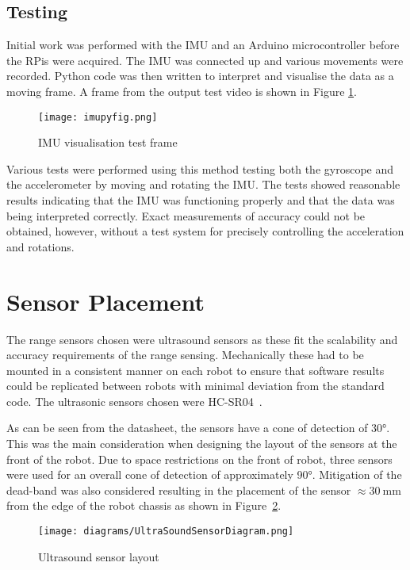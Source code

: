 \subsection{Testing}\label{elec/imu/test}
Initial work was performed with the IMU and an Arduino microcontroller
before the RPis were acquired. The IMU was connected up and various
movements were recorded. Python code was then written to interpret and
visualise the data as a moving frame. A frame from the output test video is shown in Figure \ref{fig:imu_py_test}.

\begin{figure}[!ht]
	\centering
	\texttt{[image: imupyfig.png]}
	\caption{IMU visualisation test frame}\label{fig:imu_py_test}

\end{figure}

Various tests were performed using this method testing both the gyroscope and the
accelerometer by moving and rotating the IMU. The tests showed reasonable results
indicating that the IMU was functioning properly and that the data was being interpreted
correctly. Exact measurements of accuracy could not be obtained, however, without a test
system for precisely controlling the acceleration and rotations.

\section{Sensor Placement}\label{mech/sensors}
The range sensors chosen were ultrasound sensors as these fit the
scalability and accuracy requirements of the range sensing. 
Mechanically these had to be mounted in a consistent manner on each 
robot to ensure that software results could be replicated between 
robots with minimal deviation from the standard code. The ultrasonic 
sensors chosen were HC-SR04~\cite{HCSR04datasheet}.

As can be seen from the datasheet, the sensors have a cone of 
detection of \ang{30}. This was the main consideration when designing 
the layout of the sensors at the front of the robot. Due to space 
restrictions on the front of robot, three sensors were used for an 
overall cone of detection of approximately \ang{90}. Mitigation of the dead-band was also considered resulting in the placement of
the sensor $\approx{\SI{30}{\mm}}$ from the edge of the robot chassis as shown in Figure~\ref{UltraSoundSensorDiagram}. 

\begin{figure}[!ht]
	\centering
	\texttt{[image: diagrams/UltraSoundSensorDiagram.png]}
	\caption{Ultrasound sensor layout}\label{UltraSoundSensorDiagram}

\end{figure}
 
